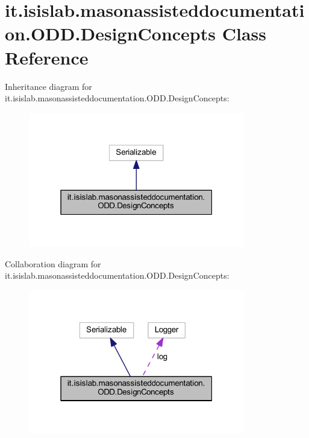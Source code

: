 \hypertarget{classit_1_1isislab_1_1masonassisteddocumentation_1_1_o_d_d_1_1_design_concepts}{\section{it.\-isislab.\-masonassisteddocumentation.\-O\-D\-D.\-Design\-Concepts Class Reference}
\label{classit_1_1isislab_1_1masonassisteddocumentation_1_1_o_d_d_1_1_design_concepts}
}


Inheritance diagram for it.\-isislab.\-masonassisteddocumentation.\-O\-D\-D.\-Design\-Concepts\-:
\nopagebreak
\begin{figure}[H]
\begin{center}
\leavevmode
\includegraphics[width=268pt]{classit_1_1isislab_1_1masonassisteddocumentation_1_1_o_d_d_1_1_design_concepts__inherit__graph}
\end{center}
\end{figure}


Collaboration diagram for it.\-isislab.\-masonassisteddocumentation.\-O\-D\-D.\-Design\-Concepts\-:
\nopagebreak
\begin{figure}[H]
\begin{center}
\leavevmode
\includegraphics[width=268pt]{classit_1_1isislab_1_1masonassisteddocumentation_1_1_o_d_d_1_1_design_concepts__coll__graph}
\end{center}
\end{figure}
